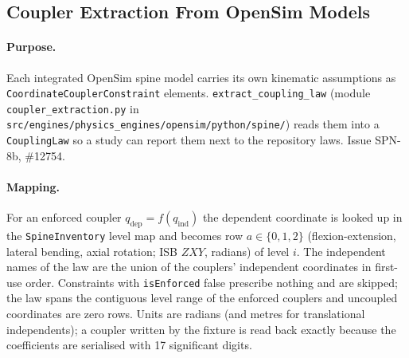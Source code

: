 \subsection{Coupler Extraction From OpenSim Models}

\paragraph{Purpose.} Each integrated OpenSim spine model carries its own
kinematic assumptions as \texttt{CoordinateCouplerConstraint} elements.
\texttt{extract\_coupling\_law} (module \texttt{coupler\_extraction.py} in
\texttt{src/engines/physics\_engines/opensim/python/spine/}) reads them into a
\texttt{CouplingLaw} so a study can report them next to the repository laws.
Issue SPN-8b, \#12754.

\paragraph{Mapping.} For an enforced coupler $q_{\mathrm{dep}} = f(q_{\mathrm{ind}})$
the dependent coordinate is looked up in the \texttt{SpineInventory} level map
and becomes row $a\in\{0,1,2\}$ (flexion-extension, lateral bending, axial
rotation; ISB $ZXY$, radians) of level $i$. The independent names of the law
are the union of the couplers' independent coordinates in first-use order.
Constraints with \texttt{isEnforced} false prescribe nothing and are skipped;
the law spans the contiguous level range of the enforced couplers and
uncoupled coordinates are zero rows. Units are radians (and metres for
translational independents); a coupler written by the fixture is read back
exactly because the coefficients are serialised with 17 significant digits.

